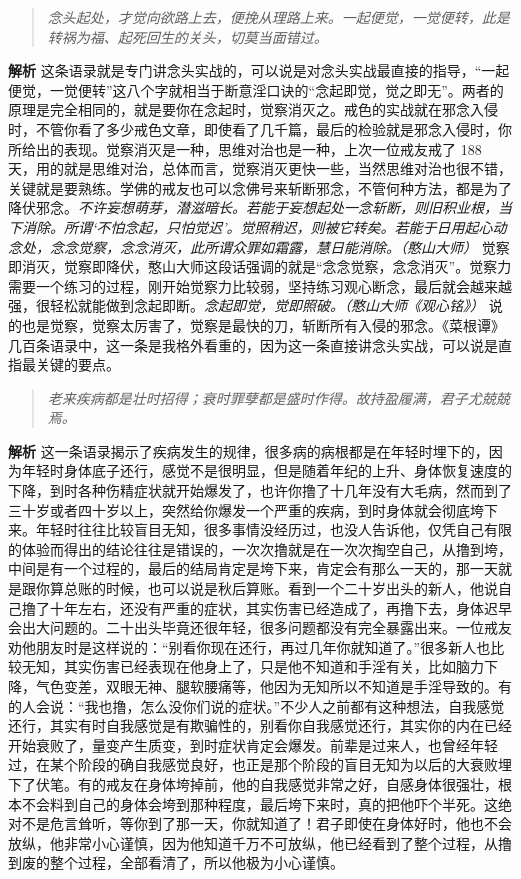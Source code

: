 \begin{quote}\it
    念头起处，才觉向欲路上去，便挽从理路上来。一起便觉，一觉便转，此是转祸为福、起死回生的关头，切莫当面错过。
\end{quote}

\textbf{解析} 这条语录就是专门讲念头实战的，可以说是对念头实战最直接的指导，“一起便觉，一觉便转”这八个字就相当于断意淫口诀的“念起即觉，觉之即无”。两者的原理是完全相同的，就是要你在念起时，觉察消灭之。戒色的实战就在邪念入侵时，不管你看了多少戒色文章，即使看了几千篇，最后的检验就是邪念入侵时，你所给出的表现。觉察消灭是一种，思维对治也是一种，上次一位戒友戒了 188 天，用的就是思维对治，总体而言，觉察消灭更快一些，当然思维对治也很不错，关键就是要熟练。学佛的戒友也可以念佛号来斩断邪念，不管何种方法，都是为了降伏邪念。\textit{不许妄想萌芽，潜滋暗长。若能于妄想起处一念斩断，则旧积业根，当下消除。所谓‘不怕念起，只怕觉迟’。觉照稍迟，则被它转矣。若能于日用起心动念处，念念觉察，念念消灭，此所谓众罪如霜露，慧日能消除。（憨山大师）} 觉察即消灭，觉察即降伏，憨山大师这段话强调的就是“念念觉察，念念消灭”。觉察力需要一个练习的过程，刚开始觉察力比较弱，坚持练习观心断念，最后就会越来越强，很轻松就能做到念起即断。\textit{念起即觉，觉即照破。（憨山大师《观心铭》）} 说的也是觉察，觉察太厉害了，觉察是最快的刀，斩断所有入侵的邪念。《菜根谭》几百条语录中，这一条是我格外看重的，因为这一条直接讲念头实战，可以说是直指最关键的要点。

\begin{quote}\it
    老来疾病都是壮时招得；衰时罪孽都是盛时作得。故持盈履满，君子尤兢兢焉。
\end{quote}

\textbf{解析} 这一条语录揭示了疾病发生的规律，很多病的病根都是在年轻时埋下的，因为年轻时身体底子还行，感觉不是很明显，但是随着年纪的上升、身体恢复速度的下降，到时各种伤精症状就开始爆发了，也许你撸了十几年没有大毛病，然而到了三十岁或者四十岁以上，突然给你爆发一个严重的疾病，到时身体就会彻底垮下来。年轻时往往比较盲目无知，很多事情没经历过，也没人告诉他，仅凭自己有限的体验而得出的结论往往是错误的，一次次撸就是在一次次掏空自己，从撸到垮，中间是有一个过程的，最后的结局肯定是垮下来，肯定会有那么一天的，那一天就是跟你算总账的时候，也可以说是秋后算账。看到一个二十岁出头的新人，他说自己撸了十年左右，还没有严重的症状，其实伤害已经造成了，再撸下去，身体迟早会出大问题的。二十出头毕竟还很年轻，很多问题都没有完全暴露出来。一位戒友劝他朋友时是这样说的：“别看你现在还行，再过几年你就知道了。”很多新人也比较无知，其实伤害已经表现在他身上了，只是他不知道和手淫有关，比如脑力下降，气色变差，双眼无神、腿软腰痛等，他因为无知所以不知道是手淫导致的。有的人会说：“我也撸，怎么没你们说的症状。”不少人之前都有这种想法，自我感觉还行，其实有时自我感觉是有欺骗性的，别看你自我感觉还行，其实你的内在已经开始衰败了，量变产生质变，到时症状肯定会爆发。前辈是过来人，也曾经年轻过，在某个阶段的确自我感觉良好，也正是那个阶段的盲目无知为以后的大衰败埋下了伏笔。有的戒友在身体垮掉前，他的自我感觉非常之好，自感身体很强壮，根本不会料到自己的身体会垮到那种程度，最后垮下来时，真的把他吓个半死。这绝对不是危言耸听，等你到了那一天，你就知道了！君子即使在身体好时，他也不会放纵，他非常小心谨慎，因为他知道千万不可放纵，他已经看到了整个过程，从撸到废的整个过程，全部看清了，所以他极为小心谨慎。

